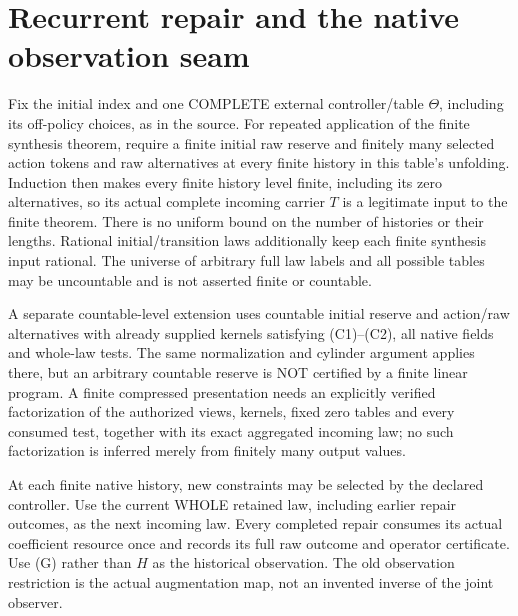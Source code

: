\documentclass[11pt]{article}
\begin{document}
\section{Recurrent repair and the native observation seam}
Fix the initial index and one COMPLETE external controller/table $\Theta$, including its off-policy choices, as in the source. For repeated application of the finite synthesis theorem, require a finite initial raw reserve and finitely many selected action tokens and raw alternatives at every finite history in this table's unfolding. Induction then makes every finite history level finite, including its zero alternatives, so its actual complete incoming carrier $T$ is a legitimate input to the finite theorem. There is no uniform bound on the number of histories or their lengths. Rational initial/transition laws additionally keep each finite synthesis input rational. The universe of arbitrary full law labels and all possible tables may be uncountable and is not asserted finite or countable.

A separate countable-level extension uses countable initial reserve and action/raw alternatives with already supplied kernels satisfying (C1)--(C2), all native fields and whole-law tests. The same normalization and cylinder argument applies there, but an arbitrary countable reserve is NOT certified by a finite linear program. A finite compressed presentation needs an explicitly verified factorization of the authorized views, kernels, fixed zero tables and every consumed test, together with its exact aggregated incoming law; no such factorization is inferred merely from finitely many output values.

At each finite native history, new constraints may be selected by the declared controller. Use the current WHOLE retained law, including earlier repair outcomes, as the next incoming law. Every completed repair consumes its actual coefficient resource once and records its full raw outcome and operator certificate. Use (G) rather than $H$ as the historical observation. The old observation restriction is the actual augmentation map, not an invented inverse of the joint observer.
\end{document}
